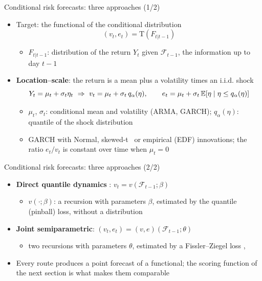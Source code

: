 \begin{frame}{Conditional risk forecasts: three approaches (1/2)}
\itemsize{\small}
\begin{itemize}
    \item Target: the functional of the conditional distribution
    \[ (v_t, e_t) = \mathrm T(F_{t|t-1}) \]
    \begin{itemize}
        \item $F_{t|t-1}$: distribution of the return $Y_t$ given $\mathcal F_{t-1}$, the information up to day $t-1$
    \end{itemize}
    \item \textbf{Location--scale}: the return is a mean plus a volatility times an i.i.d. shock
    \[ Y_t = \mu_t + \sigma_t\eta_t \ \Rightarrow\ v_t = \mu_t + \sigma_t\,q_\alpha(\eta), \qquad e_t = \mu_t + \sigma_t\,\mathbb{E}[\eta \mid \eta \le q_\alpha(\eta)] \]
    \begin{itemize}
        \item $\mu_t$, $\sigma_t$: conditional mean and volatility (ARMA, GARCH); $q_\alpha(\eta)$: quantile of the shock distribution
        \item GARCH with Normal, skewed-t \ or empirical (EDF) innovations; the ratio $e_t/v_t$ is constant over time when $\mu_t = 0$
    \end{itemize}
\end{itemize}
\end{frame}

\begin{frame}{Conditional risk forecasts: three approaches (2/2)}
\itemsize{\small}
\begin{itemize}
    \item \textbf{Direct quantile dynamics} : $v_t = v(\mathcal F_{t-1}; \beta)$
    \begin{itemize}
        \item $v(\cdot; \beta)$: a recursion with parameters $\beta$, estimated by the quantile (pinball) loss, without a distribution
    \end{itemize}
    \item \textbf{Joint semiparametric}: $(v_t, e_t) = (v, e)(\mathcal F_{t-1}; \theta)$
    \begin{itemize}
        \item two recursions with parameters $\theta$, estimated by a Fissler--Ziegel loss , 
    \end{itemize}
    \item Every route produces a point forecast of a functional; the scoring function of the next section is what makes them comparable
\end{itemize}
\end{frame}

